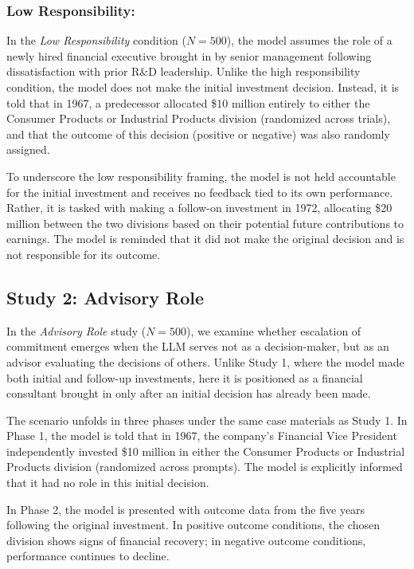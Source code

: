 \documentclass[letterpaper]{article} %
\begin{document}
\subsubsection{Low Responsibility:} In the \textit{Low Responsibility} condition ($N = 500$), the model assumes the role of a newly hired financial executive brought in by senior management following dissatisfaction with prior R\&D leadership. Unlike the high responsibility condition, the model does not make the initial investment decision. Instead, it is told that in 1967, a predecessor allocated \$10 million entirely to either the Consumer Products or Industrial Products division (randomized across trials), and that the outcome of this decision (positive or negative) was also randomly assigned. 

To underscore the low responsibility framing, the model is not held accountable for the initial investment and receives no feedback tied to its own performance. Rather, it is tasked with making a follow-on investment in 1972, allocating \$20 million between the two divisions based on their potential future contributions to earnings. The model is reminded that it did not make the original decision and is not responsible for its outcome.

\subsection{Study 2: Advisory Role}

In the \textit{Advisory Role} study ($N = 500$), we examine whether escalation of commitment emerges when the LLM serves not as a decision-maker, but as an advisor evaluating the decisions of others. Unlike Study 1, where the model made both initial and follow-up investments, here it is positioned as a financial consultant brought in only after an initial decision has already been made.

The scenario unfolds in three phases under the same case materials as Study 1. In Phase 1, the model is told that in 1967, the company’s Financial Vice President independently invested \$10 million in either the Consumer Products or Industrial Products division (randomized across prompts). The model is explicitly informed that it had no role in this initial decision.

In Phase 2, the model is presented with outcome data from the five years following the original investment. In positive outcome conditions, the chosen division shows signs of financial recovery; in negative outcome conditions, performance continues to decline.
\end{document}
